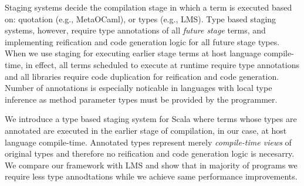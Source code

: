 Staging systems decide the compilation stage in which a term is executed based on:
 quotation (e.g., MetaOCaml), or types (e.g., LMS). Type based staging systems,
 however, require type annotations of all \emph{future stage} terms, and implementing
 reification and code generation logic for all future stage types. When we use staging
 for executing earlier stage terms at host language compile-time, in effect,
 all terms scheduled to execute at runtime require type annotations and all
 libraries require code duplication for reification and code generation. Number of
 annotations is especially noticable in languages with local type inference as method
 parameter types must be provided by the programmer.

We introduce a type based staging system for Scala where terms whose types are annotated
 are executed in the earlier stage of compilation, in our case, at host language
 compile-time. Annotated types represent merely \emph{compile-time views} of original
 types and therefore no reification and code generation logic is necesarry.
 We compare our framework with LMS and show that in majority of programs we
 require less type annodtations while we achieve same performance improvements.
